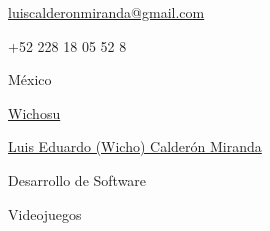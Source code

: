 \documentclass[11pt]{spidercv}
\begin{document}
    \begin{TopBar}{\ColorTextSide}

        \begin{DoubleColumns}
            \begin{ItemList}{\ColorHighlight}
                \item [\Large\faAt] \href{mailto:email@example.com}{luiscalderonmiranda@gmail.com}
                \item [\Large\faMobile] +52 228 18 05 52 8
                \item [\Large\faMapMarker] México
            \end{ItemList}
            \nextcolumn
            \begin{ItemList}{\ColorHighlight}
                \item [\Large\faGithub] \href{https://github.com/Wichosu}{Wichosu}
                \item [\Large\faLinkedinSquare] \href{https://www.linkedin.com/in/luis-eduardo-calderón-miranda-2324b2204/}{Luis Eduardo (Wicho) Calderón Miranda}
            \end{ItemList}
        \end{DoubleColumns}

        \begin{TripleColumns}
            \begin{ItemList}{\ColorHighlight}
                \item [] Desarrollo de Software
            \end{ItemList}
            \nextcolumn
            \begin{ItemList}{\ColorHighlight}
                \item [] Videojuegos
            \end{ItemList}
            \nextcolumn
        \end{TripleColumns}
    \end{TopBar}
\end{document}
